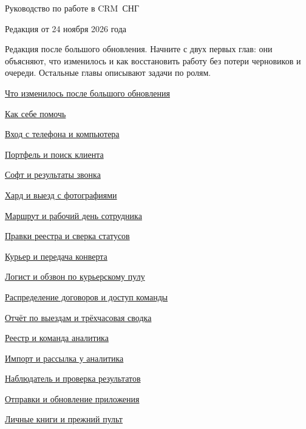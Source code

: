 \documentclass[12pt,a4paper]{article}
\newcommand{\booktitle}[1]{{\fontsize{29}{34}\selectfont #1\par}}
\newcommand{\subhead}[1]{\par\vspace{4pt}{\large\sffamily\bfseries\color{accent}#1\par}\nopagebreak}
\begin{document}
\booktitle{Руководство по работе в CRM~СНГ}
{\small\sffamily\color{muted}Редакция от 24 ноября 2026 года\par}
Редакция после большого обновления. Начните с двух первых глав: они объясняют, что изменилось и как восстановить работу без потери черновиков и очереди. Остальные главы описывают задачи по ролям.
\subhead{Содержание}
{\sffamily\hyperref[ch1]{Что изменилось после большого обновления\dotfill\pageref*{ch1}}\par}
{\sffamily\hyperref[ch2]{Как себе помочь\dotfill\pageref*{ch2}}\par}
{\sffamily\hyperref[ch3]{Вход с телефона и компьютера\dotfill\pageref*{ch3}}\par}
{\sffamily\hyperref[ch4]{Портфель и поиск клиента\dotfill\pageref*{ch4}}\par}
{\sffamily\hyperref[ch5]{Софт и результаты звонка\dotfill\pageref*{ch5}}\par}
{\sffamily\hyperref[ch6]{Хард и выезд с фотографиями\dotfill\pageref*{ch6}}\par}
{\sffamily\hyperref[ch7]{Маршрут и рабочий день сотрудника\dotfill\pageref*{ch7}}\par}
{\sffamily\hyperref[ch8]{Правки реестра и сверка статусов\dotfill\pageref*{ch8}}\par}
{\sffamily\hyperref[ch9]{Курьер и передача конверта\dotfill\pageref*{ch9}}\par}
{\sffamily\hyperref[ch10]{Логист и обзвон по курьерскому пулу\dotfill\pageref*{ch10}}\par}
{\sffamily\hyperref[ch11]{Распределение договоров и доступ команды\dotfill\pageref*{ch11}}\par}
{\sffamily\hyperref[ch12]{Отчёт по выездам и трёхчасовая сводка\dotfill\pageref*{ch12}}\par}
{\sffamily\hyperref[ch13]{Реестр и команда аналитика\dotfill\pageref*{ch13}}\par}
{\sffamily\hyperref[ch14]{Импорт и рассылка у аналитика\dotfill\pageref*{ch14}}\par}
{\sffamily\hyperref[ch15]{Наблюдатель и проверка результатов\dotfill\pageref*{ch15}}\par}
{\sffamily\hyperref[ch16]{Отправки и обновление приложения\dotfill\pageref*{ch16}}\par}
{\sffamily\hyperref[ch17]{Личные книги и прежний пульт\dotfill\pageref*{ch17}}\par}
\clearpage
{}
\end{document}
